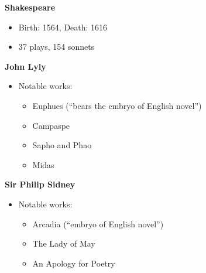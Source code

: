 \documentclass[
  12pt,
    progressbar=frametitle]{beamer}
\providecommand{\tightlist}{%
  \setlength{\itemsep}{0pt}\setlength{\parskip}{0pt}}
\begin{document}
\begin{frame}[allowframebreaks]
\large\textbf{Shakespeare}\normalsize\vspace{-3mm}

\begin{itemize}
\tightlist
\item
  Birth: 1564, Death: 1616
\item
  37 plays, 154 sonnets
\end{itemize}

\large\textbf{John Lyly}\normalsize\vspace{-3mm}

\begin{itemize}
\tightlist
\item
  Notable works:

  \begin{itemize}
  \tightlist
  \item
    Euphues (``bears the embryo of English novel'')
  \item
    Campaspe
  \item
    Sapho and Phao
  \item
    Midas
  \end{itemize}
\end{itemize}

\vspace{5mm}
\large\textbf{Sir Philip Sidney}\normalsize\vspace{-3mm}

\begin{itemize}
\tightlist
\item
  Notable works:

  \begin{itemize}
  \tightlist
  \item
    Arcadia (``embryo of English novel'')
  \item
    The Lady of May
  \item
    An Apology for Poetry
  \end{itemize}
\end{itemize}
\end{frame}
\end{document}
